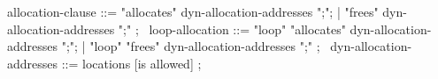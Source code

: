 \begin{syntax}
  allocation-clause ::= "allocates" dyn-allocation-addresses ";";
                      | "frees" dyn-allocation-addresses ";" ;
  \
  loop-allocation ::= "loop" "allocates"  dyn-allocation-addresses ";";
                    | "loop" "frees"  dyn-allocation-addresses ";" ;
  \
  dyn-allocation-addresses ::= locations [\nothing is allowed] ; 
 \end{syntax}
